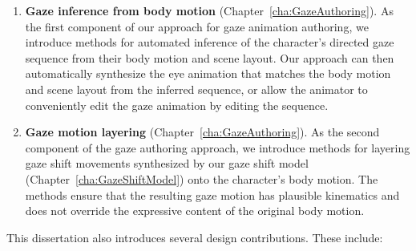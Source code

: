 \begin{enumerate}
\item \textbf{Gaze inference from body motion} (Chapter~\ref{cha:GazeAuthoring}). As the first component of our approach for gaze animation authoring, we introduce methods for automated inference of the character's directed gaze sequence from their body motion and scene layout. Our approach can then automatically synthesize the eye animation that matches the body motion and scene layout from the inferred sequence, or allow the animator to conveniently edit the gaze animation by editing the sequence.
\item \textbf{Gaze motion layering} (Chapter~\ref{cha:GazeAuthoring}). As the second component of the gaze authoring approach, we introduce methods for layering gaze shift movements synthesized by our gaze shift model (Chapter~\ref{cha:GazeShiftModel}) onto the character's body motion. The methods ensure that the resulting gaze motion has plausible kinematics and does not override the expressive content of the original body motion.
\end{enumerate}

This dissertation also introduces several design contributions. These include:

